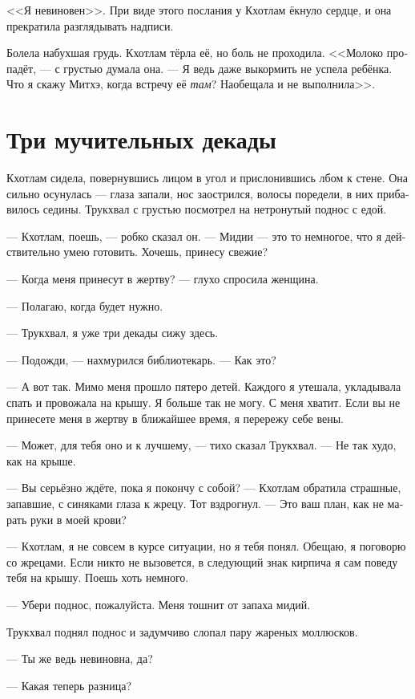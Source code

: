 \documentclass[a4paper,12pt,fleqn]{book}\usepackage{polyglossia}\setdefaultlanguage[babelshorthands=true]{russian}\setotherlanguage{english}\defaultfontfeatures{Ligatures=TeX,Mapping=tex-text}\usepackage{xcolor}\newcommand{\ml}[3]{#2}
\begin{document}
<<Я невиновен>>.
При виде этого послания у Кхотлам ёкнуло сердце, и она прекратила разглядывать надписи.

Болела набухшая грудь.
Кхотлам тёрла её, но боль не проходила.
<<Молоко пропадёт, --- с грустью думала она.
--- Я ведь даже выкормить не успела ребёнка.
Что я скажу Митхэ, когда встречу её \emph{там}?
Наобещала и не выполнила>>.

\section{Три мучительных декады}

Кхотлам сидела, повернувшись лицом в угол и прислонившись лбом к стене.
Она сильно осунулась --- глаза запали, нос заострился, волосы поредели, в них прибавилось седины.
Трукхвал с грустью посмотрел на нетронутый поднос с едой.

--- Кхотлам, поешь, --- робко сказал он.
--- Мидии --- это то немногое, что я действительно умею готовить.
Хочешь, принесу свежие?

--- Когда меня принесут в жертву? --- глухо спросила женщина.

--- Полагаю, когда будет нужно.

--- Трукхвал, я уже три декады сижу здесь.

--- Подожди, --- нахмурился библиотекарь.
--- Как это?

--- А вот так.
Мимо меня прошло пятеро детей.
Каждого я утешала, укладывала спать и провожала на крышу.
Я больше так не могу.
С меня хватит.
Если вы не принесете меня в жертву в ближайшее время, я перережу себе вены.

--- Может, для тебя оно и к лучшему, --- тихо сказал Трукхвал.
--- Не так худо, как на крыше.

--- Вы серьёзно ждёте, пока я покончу с собой? --- Кхотлам обратила страшные, запавшие, с синяками глаза к жрецу.
Тот вздрогнул.
--- Это ваш план, как не марать руки в моей крови?

--- Кхотлам, я не совсем в курсе ситуации, но я тебя понял.
Обещаю, я поговорю со жрецами.
Если никто не вызовется, в следующий знак кирпича я сам поведу тебя на крышу.
Поешь хоть немного.

--- Убери поднос, пожалуйста.
Меня тошнит от запаха мидий.

Трукхвал поднял поднос и задумчиво слопал пару жареных моллюсков.

--- Ты же ведь невиновна, да?

--- Какая теперь разница?
\end{document}
